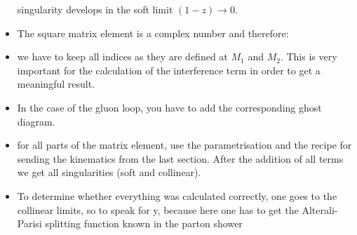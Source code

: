 \begin{itemize}
singularity develops in the soft limit $ (1-z) \rightarrow 0  $.
\item The square matrix element is a complex number and therefore:
\item we have to keep all indices as they are defined at $M_1$ and $M_2$. This is very important for the calculation of the interference term in order to get a meaningful result.
\item In the case of the gluon loop, you have to add the corresponding ghost diagram.
\item for all parts of the matrix element, use the parametrisation and the recipe for sending the kinematics from the last section.
After the addition of all terms we get all singularities (soft and collinear). 
\item To determine whether everything was calculated correctly, one goes to the collinear limits, so to speak for y, because here one has to get the Alterali-Parisi splitting function known in the parton shower
\end{itemize}